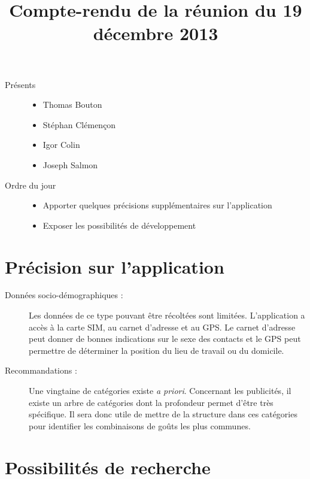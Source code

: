 \documentclass[a4paper]{article}
\title{Compte-rendu de la r\'eunion du 19 d\'ecembre 2013}
\author{}
\date{}
\begin{document}
\maketitle

\begin{description}
    \item[Pr\'esents]\hfill
        \begin{itemize}
            \item Thomas Bouton
            \item St\'ephan Cl\'emençon
            \item Igor Colin
            \item Joseph Salmon
        \end{itemize}
    \item[Ordre du jour]\hfill
        \begin{itemize}
            \item Apporter quelques pr\'ecisions suppl\'ementaires sur l'application
            \item Exposer les possibilit\'es de d\'eveloppement
        \end{itemize}
\end{description}

\section{Pr\'ecision sur l'application}
\label{sec:precision_application}

\begin{description}
    \item[Donn\'ees socio-d\'emographiques :] Les donn\'ees de ce type pouvant
        être r\'ecolt\'ees sont limit\'ees. L'application a accès à la carte SIM,
        au carnet d'adresse et au GPS. Le carnet d'adresse peut donner de
        bonnes indications sur le sexe des contacts et le GPS peut permettre
        de d\'eterminer la position du lieu de travail ou du domicile.
    \item[Recommandations :] Une vingtaine de cat\'egories existe \emph{a priori}.
        Concernant les publicit\'es, il existe un arbre de cat\'egories dont
        la profondeur permet d'être très sp\'ecifique. Il sera donc utile
        de mettre de la structure dans ces cat\'egories pour identifier
        les combinaisons de goûts les plus communes.
\end{description}

\section{Possibilit\'es de recherche}
\label{sec:possibilite_recherche}
\end{document}
